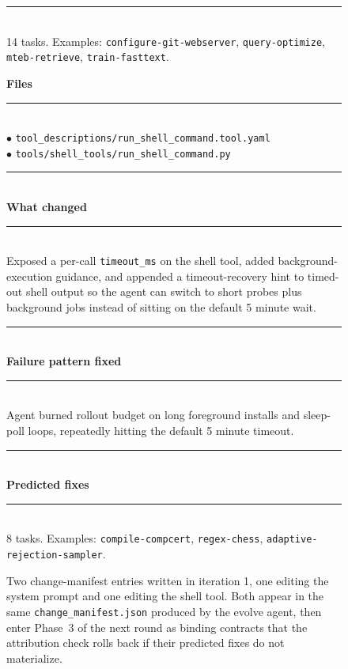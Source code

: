 \begin{figure}[t]
\begin{tcbraster}
\begin{tcolorbox}[colback=aheSky!18,colframe=aheNavy,colbacktitle=aheNavy,
                          title={\scriptsize\textbf{chg-1, iteration 1, commit \texttt{c0b8a05}, level: prompt}}]
            \rule{\linewidth}{0.3pt}\\[1pt]
            14 tasks. Examples: \texttt{configure-git-webserver}, \texttt{query-optimize}, \texttt{mteb-retrieve}, \texttt{train-fasttext}.
        \end{tcolorbox}
        \begin{tcolorbox}[colback=aheTeal!12,colframe=aheBlue,colbacktitle=aheBlue,
                          title={\scriptsize\textbf{chg-2, iteration 1, commit \texttt{169c34c}, level: tool}}]
            \textbf{\textcolor{aheBlue}{Files}} \\
            \rule{\linewidth}{0.3pt}\\[1pt]
            $\bullet$ \texttt{tool\_descriptions/run\_shell\_command.tool.yaml} \\
            $\bullet$ \texttt{tools/shell\_tools/run\_shell\_command.py} \\[3pt]
            \rule{\linewidth}{0.3pt}\\
            \textbf{\textcolor{aheBlue}{What changed}} \\
            \rule{\linewidth}{0.3pt}\\[1pt]
            Exposed a per-call \texttt{timeout\_ms} on the shell tool, added background-execution guidance, and appended a timeout-recovery hint to timed-out shell output so the agent can switch to short probes plus background jobs instead of sitting on the default 5 minute wait. \\[3pt]
            \rule{\linewidth}{0.3pt}\\
            \textbf{\textcolor{aheBlue}{Failure pattern fixed}} \\
            \rule{\linewidth}{0.3pt}\\[1pt]
            Agent burned rollout budget on long foreground installs and sleep-poll loops, repeatedly hitting the default 5 minute timeout. \\[3pt]
            \rule{\linewidth}{0.3pt}\\
            \textbf{\textcolor{aheBlue}{Predicted fixes}} \\
            \rule{\linewidth}{0.3pt}\\[1pt]
            8 tasks. Examples: \texttt{compile-compcert}, \texttt{regex-chess}, \texttt{adaptive-rejection-sampler}.
        \end{tcolorbox}
    \end{tcbraster}
    \caption{Two change-manifest entries written in iteration 1, one editing the system prompt and one editing the shell tool. Both appear in the same \texttt{change\_manifest.json} produced by the evolve agent, then enter Phase~3 of the next round as binding contracts that the attribution check rolls back if their predicted fixes do not materialize.}
    \label{fig:manifest-prompt-tool}
\end{figure}
